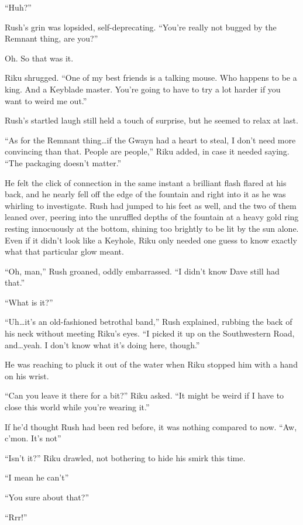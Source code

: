 ``Huh?''

Rush's grin was lopsided, self-deprecating. ``You're really not bugged by the Remnant thing, are you?''

Oh. So that was it.

Riku shrugged. ``One of my best friends is a talking mouse. Who happens to be a king. And a Keyblade master. You're going to have to try a lot harder if you want to weird me out.''

Rush's startled laugh still held a touch of surprise, but he seemed to relax at last.

``As for the Remnant thing\ldots if the Gwayn had a heart to steal, I don't need more convincing than that. People are people,'' Riku added, in case it needed saying. ``The packaging doesn't matter.''

He felt the click of connection in the same instant a brilliant flash flared at his back, and he nearly fell off the edge of the fountain and right into it as he was whirling to investigate. Rush had jumped to his feet as well, and the two of them leaned over, peering into the unruffled depths of the fountain at a heavy gold ring resting innocuously at the bottom, shining too brightly to be lit by the sun alone. Even if it didn't look like a Keyhole, Riku only needed one guess to know exactly what that particular glow meant.

``Oh, man,'' Rush groaned, oddly embarrassed. ``I didn't know Dave still had that.''

``What is it?''

``Uh\ldots it's an old-fashioned betrothal band,'' Rush explained, rubbing the back of his neck without meeting Riku's eyes. ``I picked it up on the Southwestern Road, and\ldots yeah. I don't know what it's doing here, though.''

He was reaching to pluck it out of the water when Riku stopped him with a hand on his wrist.

``Can you leave it there for a bit?'' Riku asked. ``It might be weird if I have to close this world while you're wearing it.''

If he'd thought Rush had been red before, it was nothing compared to now. ``Aw, c'mon. It's not\textemdash ''

``Isn't it?'' Riku drawled, not bothering to hide his smirk this time.

``I mean he can't\textemdash ''

``You sure about that?''

``Rrr!''

